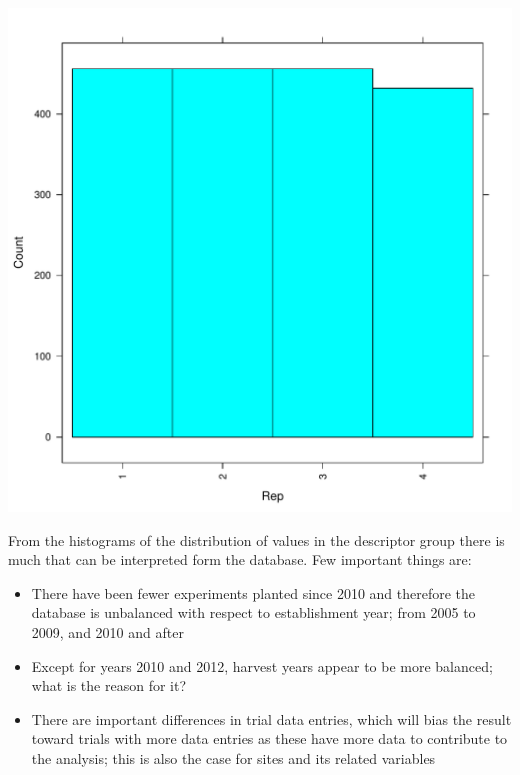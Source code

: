 \documentclass{article}\usepackage[]{graphicx}\usepackage[]{color}
\makeatletter
\def\maxwidth{ %
  \ifdim\Gin@nat@width>\linewidth
    \linewidth
  \else
    \Gin@nat@width
  \fi
}
\newenvironment{knitrout}{}{} %
\makeatother
\begin{document}
\begin{knitrout}
{}




{\centering \includegraphics[width=\maxwidth]{figure/HistogramsDescriptorVariables-7} 

}



\end{knitrout}

From the histograms of the distribution of values in the descriptor group there is much that can be interpreted form the database. Few important things are:


\begin{itemize}

  \item
  There have been fewer experiments planted since 2010 and therefore the database is unbalanced with respect to establishment year; from 2005 to 2009, and 2010 and after
  
  \item
  Except for years 2010 and 2012, harvest years appear to be more balanced; what is the reason for it? 
  
  \item
  There are important differences in trial data entries, which will bias the result toward trials with more data entries as these have more data to contribute to the analysis; this is also the case for sites and its related variables 
  
  
\end{itemize}
\end{document}
